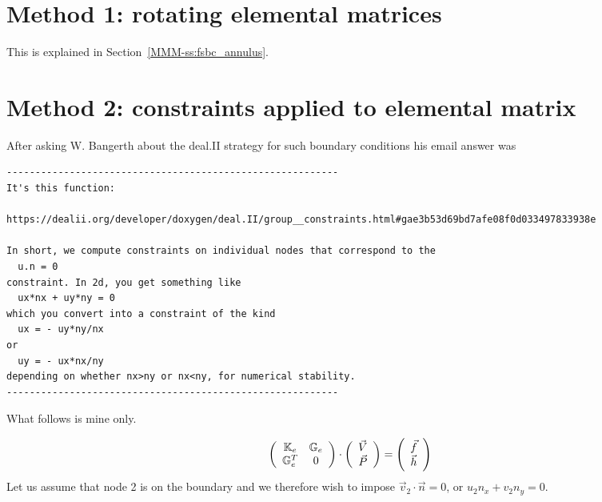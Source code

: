 \begin{center}
\end{center}




\newpage
\section*{Method 1: rotating elemental matrices}

This is explained in Section~\ref{MMM-ss:fsbc_annulus}.

\section*{Method 2: constraints applied to elemental matrix}

After asking W. Bangerth about the deal.II strategy for such boundary conditions 
his email answer was

\begin{verbatim}
----------------------------------------------------------
It's this function:

https://dealii.org/developer/doxygen/deal.II/group__constraints.html#gae3b53d69bd7afe08f0d033497833938e

In short, we compute constraints on individual nodes that correspond to the
  u.n = 0
constraint. In 2d, you get something like
  ux*nx + uy*ny = 0
which you convert into a constraint of the kind
  ux = - uy*ny/nx
or
  uy = - ux*nx/ny
depending on whether nx>ny or nx<ny, for numerical stability.
----------------------------------------------------------
\end{verbatim}

What follows is mine only.



\[
\left(
\begin{array}{cc}
{\mathbb{K}}_e & {\mathbb{G}}_e \\
{\mathbb{G}}_e^T & 0
\end{array}
\right)
\cdot
\left(
\begin{array}{c}
\vec{V} \\
\vec{P}
\end{array}
\right)
=\left(
\begin{array}{c}
\vec{f} \\ \vec{h}
\end{array}
\right)
\]
Let us assume that node 2 is on the boundary and we therefore wish to 
impose $\vec{v}_2\cdot \vec{n}=0$, or $u_2 n_x + v_2 n_y =0$.

